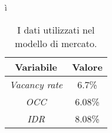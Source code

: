 ì\begin{table}[htbp]
\begin{center}
\begin{tabular}[c]{|c||c|}
\hline
Variabile &  Valore \\
\hline \hline
{\itshape Vacancy rate} & 6.7\% \\
\hline
\textit{OCC} & 6.08\% \\
\hline
\textit{IDR} & 8.08\% \\
\hline
\end{tabular}
\caption[Dati del modello di mercato]{I dati utilizzati nel modello di mercato.}
\label{tab:mulmmercato}
\end{center}
\end{table}